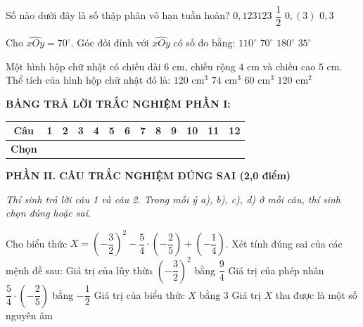 \documentclass[12pt,a4paper]{article}
\begin{document}
\begin{ex}
Số nào dưới đây là số thập phân vô hạn tuần hoàn?
\choice
{$0{,}123123$}
{$\dfrac{1}{2}$}
{\True $0{,}(3)$}
{$0{,}3$}
\end{ex}

\begin{ex}
Cho $\widehat{xOy} = 70^\circ$. Góc đối đỉnh với $\widehat{xOy}$ có số đo bằng:
\choice
{$110^\circ$}
{\True $70^\circ$}
{$180^\circ$}
{$35^\circ$}
\end{ex}

\begin{ex}
Một hình hộp chữ nhật có chiều dài $6\text{ cm}$, chiều rộng $4\text{ cm}$ và chiều cao $5\text{ cm}$. Thể tích của hình hộp chữ nhật đó là:
\choice
{\True $120\text{ cm}^3$}
{$74\text{ cm}^3$}
{$60\text{ cm}^3$}
{$120\text{ cm}^2$}
\end{ex}


\vspace{1mm}
\noindent\textbf{BẢNG TRẢ LỜI TRẮC NGHIỆM PHẦN I:}
\begin{center}
\begin{tabular}{|c|c|c|c|c|c|c|c|c|c|c|c|c|}
\hline
\textbf{Câu} & \textbf{1} & \textbf{2} & \textbf{3} & \textbf{4} & \textbf{5} & \textbf{6} & \textbf{7} & \textbf{8} & \textbf{9} & \textbf{10} & \textbf{11} & \textbf{12} \\
\hline
\textbf{Chọn} & \rule{0pt}{0.48cm} & & & & & & & & & & & \\
\hline
\end{tabular}
\end{center}
\vspace{1mm}

\setcounter{ex}{0}
\noindent\textbf{\large PHẦN II. CÂU TRẮC NGHIỆM ĐÚNG SAI (2,0 điểm)}

\textit{Thí sinh trả lời câu 1 và câu 2. Trong mỗi ý a), b), c), d) ở mỗi câu, thí sinh chọn đúng hoặc sai.}

\vspace{1mm}
\begin{ex}
Cho biểu thức $X = \left(-\dfrac{3}{2}\right)^2 - \dfrac{5}{4} \cdot \left(-\dfrac{2}{5}\right) + \left(-\dfrac{1}{4}\right)$. Xét tính đúng sai của các mệnh đề sau:
\choiceTF
{\True Giá trị của lũy thừa $\left(-\dfrac{3}{2}\right)^2$ bằng $\dfrac{9}{4}$}
{\True Giá trị của phép nhân $\dfrac{5}{4} \cdot \left(-\dfrac{2}{5}\right)$ bằng $-\dfrac{1}{2}$}
{Giá trị của biểu thức $X$ bằng $3$}
{Giá trị $X$ thu được là một số nguyên âm}
\end{ex}
\end{document}

